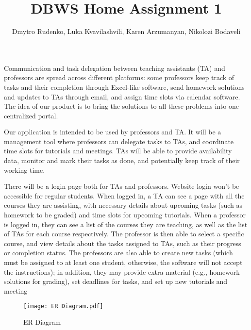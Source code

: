 \documentclass[]{article}
\title{DBWS Home Assignment 1}
\author{Dmytro Rudenko, Luka Kvavilashvili, Karen Arzumanyan, Nikolozi Bodaveli}
\begin{document}
\maketitle



Communication and task delegation between teaching assistants (TA) and professors are spread across different platforms: some professors keep track of tasks and their completion through Excel-like software, send homework solutions and updates to TAs through email, and assign time slots via calendar software. The idea of our product is to bring the solutions to all these problems into one centralized portal.
\newline


Our application is intended to be used by professors and TA. It will be a management tool where professors can delegate tasks to TAs, and coordinate time slots for tutorials and meetings. TAs will be able to provide availability data, monitor and mark their tasks as done, and potentially keep track of their working time.
\newline 


There will be a login page both for TAs and professors. Website login won't be accessible for regular students. When logged in, a TA can see a page with all the courses they are assisting, with necessary details about upcoming tasks (such as homework to be graded) and time slots for upcoming tutorials. When a professor is logged in, they can see a list of the courses they are teaching, as well as the list of TAs for each course respectively. The professor is then able to select a specific course, and view details about the tasks assigned to TAs, such as their progress or completion status. The professors are also able to create new tasks (which must be assigned to at least one student, otherwise, the software will not accept the instructions); in addition, they may provide extra material (e.g., homework solutions for grading), set deadlines for tasks, and set up new tutorials and meeting



\begin{figure}[h]
	\centering
	\texttt{[image: ER Diagram.pdf]}
	\captionsetup{labelformat=empty}
	\caption{ER Diagram}
	\label{FIgure}
\end{figure}
	
\end{document}
